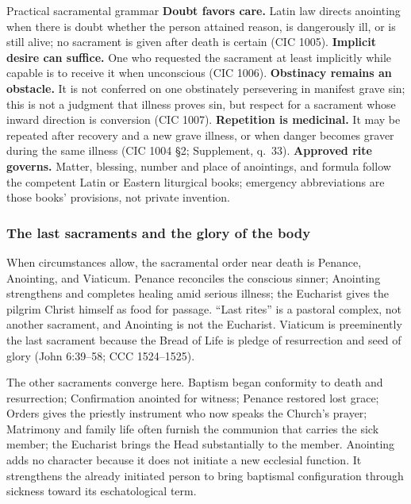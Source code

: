 \begin{studybox}{Practical sacramental grammar}
\textbf{Doubt favors care.} Latin law directs anointing when there is doubt whether the person attained reason, is dangerously ill, or is still alive; no sacrament is given after death is certain (CIC 1005). \textbf{Implicit desire can suffice.} One who requested the sacrament at least implicitly while capable is to receive it when unconscious (CIC 1006). \textbf{Obstinacy remains an obstacle.} It is not conferred on one obstinately persevering in manifest grave sin; this is not a judgment that illness proves sin, but respect for a sacrament whose inward direction is conversion (CIC 1007). \textbf{Repetition is medicinal.} It may be repeated after recovery and a new grave illness, or when danger becomes graver during the same illness (CIC 1004 \S2; Supplement, q.~33). \textbf{Approved rite governs.} Matter, blessing, number and place of anointings, and formula follow the competent Latin or Eastern liturgical books; emergency abbreviations are those books' provisions, not private invention.
\end{studybox}

\subsubsection{The last sacraments and the glory of the body}

When circumstances allow, the sacramental order near death is Penance, Anointing, and Viaticum. Penance reconciles the conscious sinner; Anointing strengthens and completes healing amid serious illness; the Eucharist gives the pilgrim Christ himself as food for passage. ``Last rites'' is a pastoral complex, not another sacrament, and Anointing is not the Eucharist. Viaticum is preeminently the last sacrament because the Bread of Life is pledge of resurrection and seed of glory (John 6:39--58; CCC 1524--1525).

The other sacraments converge here. Baptism began conformity to death and resurrection; Confirmation anointed for witness; Penance restored lost grace; Orders gives the priestly instrument who now speaks the Church's prayer; Matrimony and family life often furnish the communion that carries the sick member; the Eucharist brings the Head substantially to the member. Anointing adds no character because it does not initiate a new ecclesial function. It strengthens the already initiated person to bring baptismal configuration through sickness toward its eschatological term.

